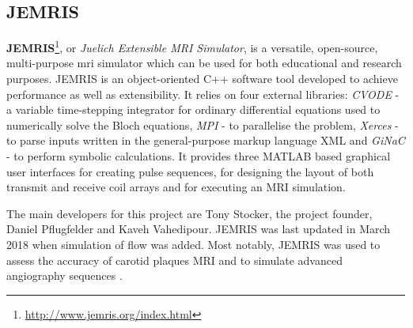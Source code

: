 \subsection{JEMRIS}
\textbf{JEMRIS}\footnote{\url{http://www.jemris.org/index.html}}, or \textit{Juelich Extensible MRI Simulator}, is a versatile, open-source, multi-purpose \ac{mri} simulator which can be used for both educational and research purposes.
JEMRIS is an object-oriented C++ software tool developed to achieve performance as well as extensibility.
It relies on four external libraries: \textit{CVODE} - a variable time-stepping integrator for ordinary differential equations used to numerically solve the Bloch equations, \textit{MPI} - to parallelise the problem, \textit{Xerces} - to parse inputs written in the general-purpose markup language XML and \textit{GiNaC} - to perform symbolic calculations. 
It provides three MATLAB based graphical user interfaces for creating pulse sequences, for designing the layout of both transmit and receive coil arrays and for executing an MRI simulation.

\hfill

The main developers for this project are Tony Stocker, the project founder, Daniel Pflugfelder and Kaveh Vahedipour.
JEMRIS was last updated in March 2018 when simulation of flow was added.
Most notably, JEMRIS was used to assess the accuracy of carotid plaques MRI \cite{Nieuwstadt2014} and to simulate advanced angiography sequences \cite{Fortin2016}.

\hfill


